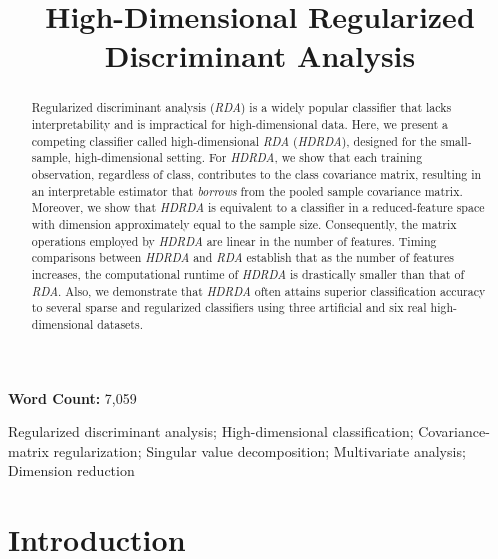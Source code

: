 \documentclass[]{interact}\usepackage[]{graphicx}\usepackage[]{color}
\begin{document}

\title{High-Dimensional Regularized Discriminant Analysis}

\maketitle

\doublespacing

\textbf{Word Count:} 7,059

\begin{abstract}

Regularized discriminant analysis (\emph{RDA}) is a widely popular classifier
that lacks interpretability and is impractical for high-dimensional data. Here,
we present a competing classifier called high-dimensional \emph{RDA}
(\emph{HDRDA}), designed for the small-sample, high-dimensional setting. For
\emph{HDRDA}, we show that each training observation, regardless of class,
contributes to the class covariance matrix, resulting in an interpretable
estimator that \emph{borrows} from the pooled sample covariance
matrix. Moreover, we show that \emph{HDRDA} is equivalent to a classifier in a
reduced-feature space with dimension approximately equal to the sample
size. Consequently, the matrix operations employed by \emph{HDRDA} are linear
in the number of features. Timing comparisons between \emph{HDRDA} and \emph{RDA}
establish that as the number of features increases, the computational runtime
of \emph{HDRDA} is drastically smaller than that of \emph{RDA}. Also, we
demonstrate that \emph{HDRDA} often attains superior classification accuracy to
several sparse and regularized classifiers using three artificial and six real
high-dimensional datasets.

\end{abstract}

\begin{keywords}
Regularized discriminant analysis; High-dimensional classification; Covariance-matrix regularization; Singular value decomposition; Multivariate analysis; Dimension reduction
\end{keywords}














\section{Introduction}
\end{document}
